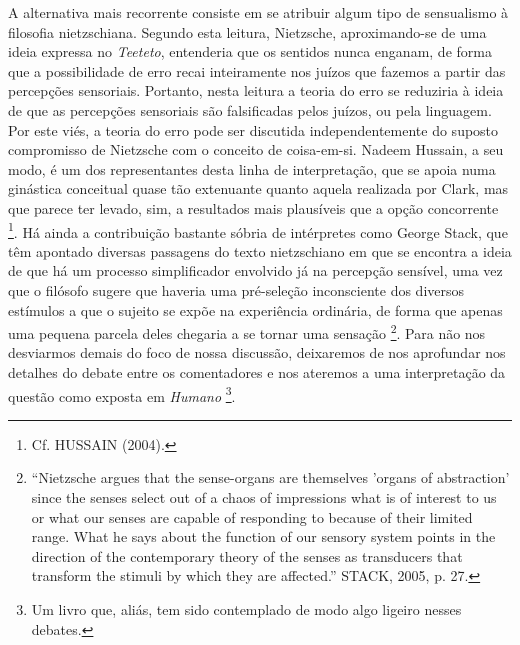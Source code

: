 \documentclass[
	12pt,				%
	openright,			%
	oneside,			%
	a4paper,			%
	english,			%
	french,				%
	spanish,			%
	brazil				%
	]{abntex2}
\begin{document}
A alternativa mais recorrente consiste em se atribuir algum tipo de sensualismo à filosofia nietzschiana. Segundo esta leitura, Nietzsche, aproximando-se de uma ideia expressa no \textit{Teeteto}, entenderia que os sentidos nunca enganam, de forma que a possibilidade de erro recai inteiramente nos juízos que fazemos a partir das percepções sensoriais. Portanto, nesta leitura a teoria do erro se reduziria à ideia de que as percepções sensoriais são falsificadas pelos juízos, ou pela linguagem. Por este viés, a teoria do erro pode ser discutida independentemente do suposto compromisso de Nietzsche com o conceito de coisa-em-si. Nadeem Hussain, a seu modo, é um dos representantes desta linha de interpretação, que se apoia numa ginástica conceitual quase tão extenuante quanto aquela realizada por Clark, mas que parece ter levado, sim, a resultados mais plausíveis que a opção concorrente
\footnote{Cf. HUSSAIN (2004).}. 
Há ainda a contribuição bastante sóbria de intérpretes como George Stack, que têm apontado diversas passagens do texto nietzschiano em que se encontra a ideia de que há um processo simplificador envolvido já na percepção sensível, uma vez que o filósofo sugere que haveria uma pré-seleção inconsciente dos diversos estímulos a que o sujeito se expõe na experiência ordinária, de forma que apenas uma pequena parcela deles chegaria a se tornar uma sensação
\footnote{“Nietzsche argues that the sense-organs are themselves 'organs of abstraction' since the senses select out of a chaos of impressions what is of interest to us or what our senses are capable of responding to because of their limited range. What he says about the function of our sensory system points in the direction of the contemporary theory of the senses as transducers that transform the stimuli by which they are affected.” STACK, 2005, p. 27.}. 
Para não nos desviarmos demais do foco de nossa discussão, deixaremos de nos aprofundar nos detalhes do debate entre os comentadores e nos ateremos a uma interpretação da questão como exposta em \textit{Humano}
\footnote{Um livro que, aliás, tem sido contemplado de modo algo ligeiro nesses debates.}.
\end{document}
